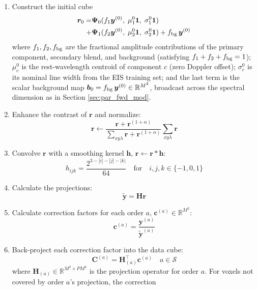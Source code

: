 \documentclass[linenumbers,twocolumn]{aastex7}
\begin{document}
\begin{enumerate}
\item Construct the initial cube
\begin{align}
\bm r_0 =& \bm \Psi_0(f_1 \bm y^{(0)},\; \mu_1^0 \bm 1,\; \sigma_1^0 \bm 1)
\nonumber\\
         +& \bm \Psi_1(f_2 \bm y^{(0)},\; \mu_2^0 \bm 1,\; \sigma_2^0 \bm 1)+ f_{\rm bg}\, \bm y^{(0)}
\nonumber\\
\label{eq:mart_init}
\end{align}
where $f_1, f_2, f_{\rm bg}$ are the fractional amplitude contributions of the
primary component, secondary blend, and background (satisfying $f_1 + f_2 +
f_{\rm bg} = 1$); $\mu_c^0$ is the rest-wavelength centroid of component $c$
(zero Doppler offset); $\sigma_c^0$ is its nominal line width from the EIS
training set; and the last term is the scalar background map
$\bm b_0 = f_{\rm bg}\,\bm y^{(0)} \in \mathbb R^{M^2}$, broadcast across the
spectral dimension as in Section \ref{sec:par_fwd_mod}.
\item Enhance the contrast of $\bm r$ and normalize:
\begin{equation}
\bm r \leftarrow \frac{\bm r+\bm r^{(1+\alpha)}}{\sum_{xy\lambda}\bm r + \bm
r^{(1+\alpha)}}\sum_{xy\lambda}\bm r
\end{equation}
\item Convolve $\bm r$ with a smoothing kernel $\bm h$, $\bm r \leftarrow \bm r
\ast \bm h$:
\begin{equation}
    h_{ijk} = \frac{2^{3-|i|-|j|-|k|}}{64} \quad \text{for} \quad i,j,k \in \{-1,0,1\}
\end{equation}
\item Calculate the projections:
\begin{equation}
\tilde {\bm y} = \bm H \bm r
\end{equation}
\item Calculate correction factors for each order $a$, $\bm c^{(a)} \in \mathbb R^{M^2}$:
\begin{equation}
    \bm c^{(a)} = \frac{\bm y^{(a)}}{\tilde {\bm y}^{(a)}}
\end{equation}
\item Back-project each correction factor into the data cube:
\begin{equation}
    \bm C^{(a)} = \bm H^\top_{(a)} \bm c^{(a)} \quad a \in \mathcal S
\end{equation}
where $\bm H_{(a)} \in \mathbb R^{M^2 \times PM^2}$ is the projection operator
for order $a$. For voxels not covered by order $a$'s projection, the correction

\end{enumerate}
\end{document}
